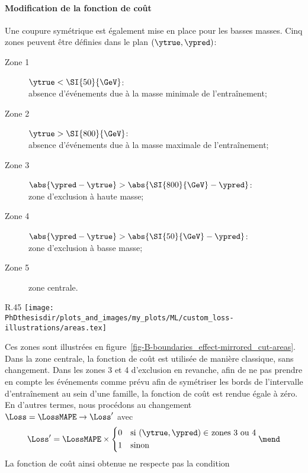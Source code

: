 \paragraph{Modification de la fonction de coût}
Une coupure symétrique est également mise en place pour les basses masses.
Cinq zones peuvent être définies dans le plan $(\ytrue, \ypred)$:
\begin{description}
\item[Zone 1] $\ytrue < \SI{50}{\GeV}$:\\
absence d'événements due à la masse minimale de l'entraînement;
\item[Zone 2] $\ytrue > \SI{800}{\GeV}$:\\
absence d'événements due à la masse maximale de l'entraînement;
\item[Zone 3] $\abs{\ypred - \ytrue} > \abs{\SI{800}{\GeV} - \ypred}$:\\
zone d'exclusion à haute masse;
\item[Zone 4] $\abs{\ypred - \ytrue} > \abs{\SI{50}{\GeV} - \ypred}$:\\
zone d'exclusion à basse masse;
\item[Zone 5] zone centrale.
\end{description}
\begin{wrapfigure}{R}{.45\textwidth}
\centering
\texttt{[image: \\PhDthesisdir/plots\_and\_images/my\_plots/ML/custom\_loss-illustrations/areas.tex]}
\caption{Zones considérées pour l'entraînement.}
\label{fig-B-boundaries_effect-mirrored_cut-areas}
\end{wrapfigure}
\par\noindent
Ces zones sont illustrées en figure~\ref{fig-B-boundaries_effect-mirrored_cut-areas}.
Dans la zone centrale, la fonction de coût est utilisée de manière classique, sans changement.
Dans les zones 3 et 4 d'exclusion en revanche,
afin de ne pas prendre en compte les événements comme prévu afin de symétriser les bords de l'intervalle d'entraînement au sein d'une famille,
la fonction de coût est rendue égale à zéro.
En d'autres termes, nous procédons au changement
$\Loss=\LossMAPE\to\Loss'$ avec
\begin{equation}
\Loss' = \LossMAPE \times
\left\lbrace
\begin{aligned}
0 \quad & \text{si $(\ytrue, \ypred)\in$ zones 3 ou 4}\\
1 \quad & \text{sinon}
\end{aligned}
\right.
\mend
\end{equation}
La fonction de coût ainsi obtenue ne respecte pas la condition
